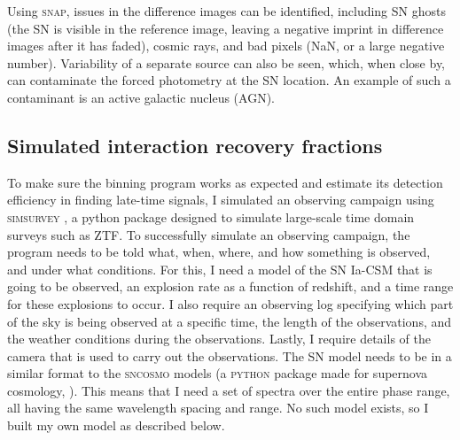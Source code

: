 \documentclass[a4paper,oneside,12pt, class=Latex/Classes/PhDthesisPSnPDF, crop=false]{standalone}
\begin{document}
Using \textsc{snap}, issues in the difference images can be identified, including SN ghosts (the SN is visible in the reference image, leaving a negative imprint in difference images after it has faded), cosmic rays, and bad pixels (NaN, or a large negative number). Variability of a separate source can also be seen, which, when close by, can contaminate the forced photometry at the SN location. An example of such a contaminant is an active galactic nucleus (AGN).


\subsection{Simulated interaction recovery fractions}
\label{simulation}
To make sure the binning program works as expected and estimate its detection efficiency in finding late-time signals, I simulated an observing campaign using \textsc{simsurvey} \citep{simsurvey, simsurvey_main}, a python package designed to simulate large-scale time domain surveys such as ZTF. To successfully simulate an observing campaign, the program needs to be told what, when, where, and how something is observed, and under what conditions. For this, I need a model of the SN Ia-CSM that is going to be observed, an explosion rate as a function of redshift, and a time range for these explosions to occur. I also require an observing log specifying which part of the sky is being observed at a specific time, the length of the observations, and the weather conditions during the observations. Lastly, I require details of the camera that is used to carry out the observations. The SN model needs to be in a similar format to the \textsc{sncosmo} models (a \textsc{python} package made for supernova cosmology, \citealt{sncosmo}). This means that I need a set of spectra over the entire phase range, all having the same wavelength spacing and range. No such model exists, so I built my own model as described below.
\end{document}
